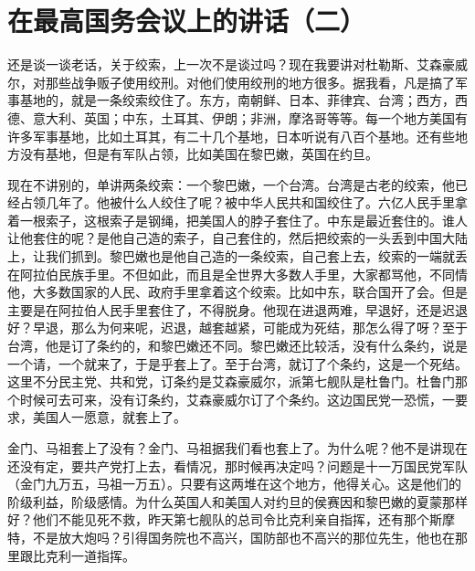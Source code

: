 \section[在最高国务会议上的讲话（二）（一九五八年九月八日）]{在最高国务会议上的讲话（二）}


还是谈一谈老话，关于绞索，上一次不是谈过吗？现在我要讲对杜勒斯、艾森豪威尔，对那些战争贩子使用绞刑。对他们使用绞刑的地方很多。据我看，凡是搞了军事基地的，就是一条绞索绞住了。东方，南朝鲜、日本、菲律宾、台湾；西方，西德、意大利、英国；中东，土耳其、伊朗；非洲，摩洛哥等等。每一个地方美国有许多军事基地，比如土耳其，有二十几个基地，日本听说有八百个基地。还有些地方没有基地，但是有军队占领，比如美国在黎巴嫩，英国在约旦。

现在不讲别的，单讲两条绞索：一个黎巴嫩，一个台湾。台湾是古老的绞索，他已经占领几年了。他被什么人绞住了呢？被中华人民共和国绞住了。六亿人民手里拿着一根索子，这根索子是钢绳，把美国人的脖子套住了。中东是最近套住的。谁人让他套住的呢？是他自己造的索子，自己套住的，然后把绞索的一头丢到中国大陆上，让我们抓到。黎巴嫩也是他自己造的一条绞索，自己套上去，绞索的一端就丢在阿拉伯民族手里。不但如此，而且是全世界大多数人手里，大家都骂他，不同情他，大多数国家的人民、政府手里拿着这个绞索。比如中东，联合国开了会。但是主要是在阿拉伯人民手里套住了，不得脱身。他现在进退两难，早退好，还是迟退好？早退，那么为何来呢，迟退，越套越紧，可能成为死结，那怎么得了呀？至于台湾，他是订了条约的，和黎巴嫩还不同。黎巴嫩还比较活，没有什么条约，说是一个请，一个就来了，于是乎套上了。至于台湾，就订了个条约，这是一个死结。这里不分民主党、共和党，订条约是艾森豪威尔，派第七舰队是杜鲁门。杜鲁门那个时候可去可来，没有订条约，艾森豪威尔订了个条约。这边国民党一恐慌，一要求，美国人一愿意，就套上了。

金门、马祖套上了没有？金门、马祖据我们看也套上了。为什么呢？他不是讲现在还没有定，要共产党打上去，看情况，那时候再决定吗？问题是十一万国民党军队（金门九万五，马祖一万五）。只要有这两堆在这个地方，他得关心。这是他们的阶级利益，阶级感情。为什么英国人和美国人对约旦的侯赛因和黎巴嫩的夏蒙那样好？他们不能见死不救，昨天第七舰队的总司令比克利亲自指挥，还有那个斯摩特，不是放大炮吗？引得国务院也不高兴，国防部也不高兴的那位先生，他也在那里跟比克利一道指挥。

